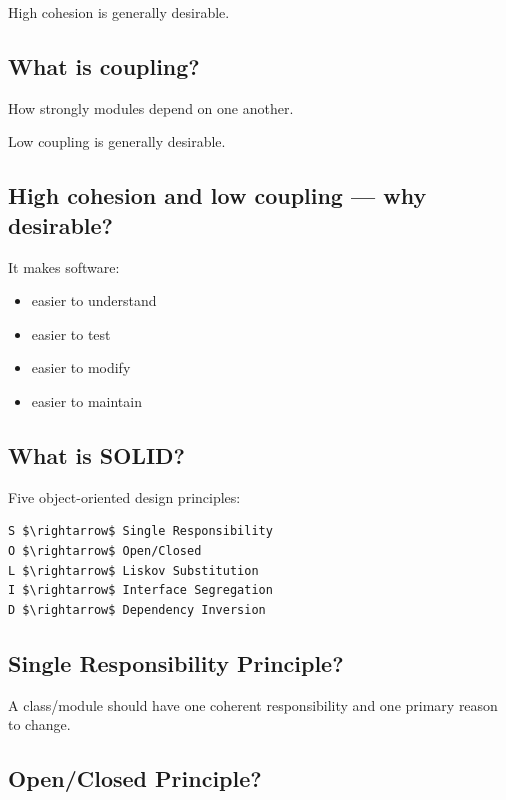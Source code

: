 High cohesion is generally desirable.

\medskip

\subsection{What is coupling?}

How strongly modules depend on one another.

Low coupling is generally desirable.

\medskip

\subsection{High cohesion and low coupling --- why desirable?}

It makes software:

\begin{itemize}
  \item easier to understand
  \item easier to test
  \item easier to modify
  \item easier to maintain
\end{itemize}

\medskip

\subsection{What is SOLID?}

Five object-oriented design principles:

\begin{lstlisting}
S $\rightarrow$ Single Responsibility
O $\rightarrow$ Open/Closed
L $\rightarrow$ Liskov Substitution
I $\rightarrow$ Interface Segregation
D $\rightarrow$ Dependency Inversion
\end{lstlisting}

\medskip

\subsection{Single Responsibility Principle?}

A class/module should have one coherent responsibility and one primary reason to change.

\medskip

\subsection{Open/Closed Principle?}

